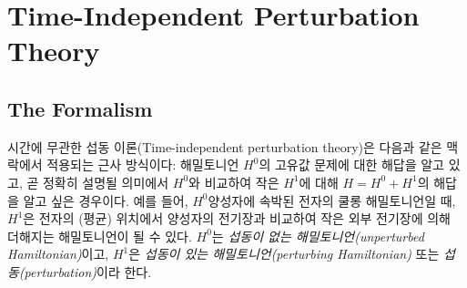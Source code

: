 %
%
%
\chapter{Time-Independent Perturbation Theory}
\label{ch:17} %



\section{The Formalism}

시간에 무관한 섭동 이론(Time-independent perturbation theory)은 다음과 같은 맥락에서 적용되는 근사 방식이다: 해밀토니언 $H^0$의 고유값 문제에 대한 해답을 알고 있고, 곧 정확히 설명될 의미에서 $H^0$와 비교하여 작은 $H^1$에 대해 $H=H^0+H^1$의 해답을 알고 싶은 경우이다. 예를 들어, $H^0$\는 양성자에 속박된 전자의 쿨롱 해밀토니언일 때, $H^1$은 전자의 (평균) 위치에서 양성자의 전기장과 비교하여 작은 외부 전기장에 의해 더해지는 해밀토니언이 될 수 있다. $H^0$는 \emph{섭동이 없는 해밀토니언(unperturbed Hamiltonian)}이고, $H^1$은 \emph{섭동이 있는 해밀토니언(perturbing Hamiltonian)} 또는 \emph{섭동(perturbation)}이라 한다.

